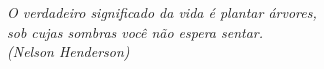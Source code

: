 \begin{epigrafe}
    \vspace*{\fill}
	\begin{flushright}
		\textit{O verdadeiro significado da vida é plantar árvores,\\ sob cujas sombras você não espera sentar.\\
		(Nelson Henderson)}
	\end{flushright}
\end{epigrafe}